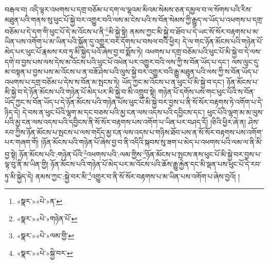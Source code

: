 བརྒལ་བ། འདི་ལྟར་འཕགས་པ་དགྲ་བཅོམ་པ་དག་ལ་ལྷའམ་མིའམ་སེམས་ཅན་དམྱལ་བ་ལ་སོགས་པའི་རིས་མཐུན་པའི་གནས་སུ་ཕུང་པོ་སྐྱེ་བར་འགྱུར་བའི་ལས་མ་ངེས་པའི་ས་བོན་སེམས་ཀྱི་རྒྱུད་ལ་ཡོད་པ་འཕགས་པ་དགྲ་བཅོམ་པ་དེ་དག་གི་ཕུང་པོ་དེ་མ་འོངས་པ་ནི་\footnote{«སྣར་»«པེ་»ན་}མི་སྐྱེ་སྟེ། ནམས་ཀྱང་མི་སྐྱེ་བ་ཐོབ་པ་དེ་ཡང་སོ་སོར་བརྟགས་པ་མ་ཡིན་པས་འགོག་པ་མ་ཡིན་པའི་སྐྱོན་དུ་འགྱུར་བར་དོགས་པ་བསལ་བའི་ཕྱིར། དེ་ལ་གང་ཉོན་མོངས་པའི་གཉེན་པོ་མེད་པར་ཕུང་པོ་རྣམས་རབ་ཏུ་མི་སྐྱེད་པའོ་ཞེས་བྱ་བ་སྨོས་ཏེ། འཕགས་པ་དགྲ་བཅོམ་པའི་ཕུང་པོ་མི་སྐྱེ་བ་དེ་ལས་དགེ་བ་བྱས་པས་ལས་དེས་མ་འོངས་པའི་ཕུང་པོ་འཕེན་པར་འགྱུར་བའི་ལས་ཀྱི་ས་བོན་ཡོད་པ་དང་། ལས་ལུང་དུ་མ་བསྟན་པ་བྱས་པས་མ་འོངས་པ་ན་བཟོ་ཤེས་པའི་ལུས་སྐྱེ་བར་འགྱུར་བའི་རྒྱུ་མཐུན་པའི་ལས་ཀྱི་ས་བོན་ཡོད་པ་འཕགས་པ་དགྲ་བཅོམ་པ་དེས་ས་བོན་མ་སྤངས་ཏེ། ཡོད་ཀྱང་མ་འོངས་པ་ན་ཕུང་པོ་མི་སྐྱེ་བ་དང་། ཉོན་མོངས་པ་མི་སྐྱེ་བ་དེ་ཉོན་མོངས་པའི་གཉེན་པོ་མེད་པར་མི་སྐྱེ་བ་མི་འགྲུབ་སྟེ། གཉེན་པོ་དགོས་པས་གང་ཕུང་པོའི་ས་བོན་ཡོད་ཀྱང་ས་བོན་ཡོད་པ་དེ་ཉོན་མོངས་པའི་གཉེན་པོས་ཕུང་པོ་མི་སྐྱེ་བར་བྱས་པ་ནི་སོ་སོར་བརྟགས་ཏེ་འགོག་པ་དེ་ཉིད་དེ། དེ་བས་ན་ཕུང་པོའི་ལྷག་མ་དང་བཅས་པའི་མྱ་ངན་ལས་འདས་པའི་དབྱིངས་དང་། ཕུང་པོའི་ལྷག་མ་མ་ལུས་པའི་མྱ་ངན་ལས་འདས་པའི་དབྱིངས་ནི་སོ་སོར་བརྟགས་པས་འགོག་པ་ཡིན་པར་བཤད་དོ། །ཅིའི་ཕྱིར་ཞེ་ན། ཤེས་རབ་ཀྱིས་ཉོན་མོངས་པ་སྤངས་པ་ལས་གདོད་མྱ་ངན་ལས་འདས་པ་གཉིས་ཐོབ་པས་ན་སོ་སོར་བརྟགས་པས་འགོག་པར་གཞག་གོ། །ཉོན་མོངས་པའི་གཉེན་པོ་ཞེས་བྱ་བ་ནི་འདིའི་སྐབས་སུ་ཟག་པ་མེད་པ་འཕགས་པའི་ལམ་ལ་ནི་མི་བྱ་སྟེ། ཉོན་མོངས་པའི་:གཉེན་པོའི་\footnote{«སྣར་»«པེ་»གཉེན་པོ་}འཕགས་པའི་:ལམ་གྱིས་\footnote{«སྣར་»«པེ་»ལམ་གྱི་}ཉོན་མོངས་པ་སྤངས་ནས་ཕུང་པོ་མི་སྐྱེ་བར་བྱས་པ་ལྟ་བུ་ནི་མ་ཡིན་གྱི། ཉོན་མོངས་པའི་གཉེན་པོ་མེད་པར་མ་འོངས་པའི་ཆོས་རྒྱུ་རྐྱེན་དང་མི་ལྡན་པས་ཕུང་པོ་དེ་རབ་ཏུ་མི་སྐྱེད་དེ། ནམས་ཀྱང་:སྐྱེ་བར་མི་\footnote{«སྣར་»«པེ་»སྐྱེ་བར་}འགྱུར་བ་ནི་སོ་སོར་བརྟགས་པ་མ་ཡིན་པས་འགོག་པ་ཞེས་བྱའོ། །

